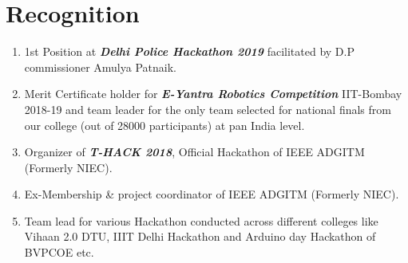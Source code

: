 \documentclass[10pt]{report}
\begin{document}
\section*{\color{BlueViolet}\faTrophy\hspace{1pt} Recognition}
\begin{enumerate}
\vspace{-1em}\item 1st Position at \textbf{\emph{Delhi Police Hackathon 2019}}  facilitated by D.P commissioner Amulya Patnaik.
	\item Merit Certificate holder for \textbf{\emph{E-Yantra Robotics Competition}} IIT-Bombay 2018-19 and team leader for the only team selected for national finals from our college (out of 28000 participants) at pan India level.
	\item Organizer of \textbf{\emph{T-HACK 2018}}, Official Hackathon of IEEE ADGITM (Formerly NIEC).
	\item Ex-Membership \& project coordinator of IEEE ADGITM (Formerly NIEC).
	\item Team lead for various Hackathon conducted across different colleges like Vihaan 2.0 DTU, IIIT Delhi Hackathon and Arduino day Hackathon of BVPCOE etc.\vspace{-1em}
\end{enumerate}

\end{document}
